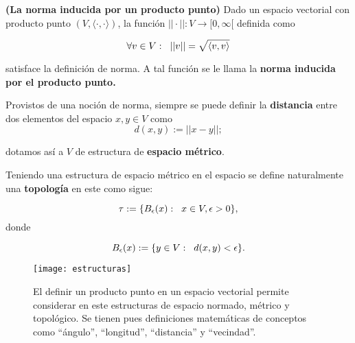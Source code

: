 \begin{prop}
\label{prop: La norma inducida por un producto punto}
\textbf{(La norma inducida por un producto punto)}
Dado un espacio vectorial con
producto punto $(V, \langle \cdot , \cdot \rangle )$, 
la función $|| \cdot || : V \longrightarrow [0, \infty[$ definida como

\begin{equation}
\label{eq: norma via producto punto}
\forall v \in V: \hspace{0.2cm} || v || = \sqrt{\langle v,v \rangle}
\end{equation}

\noindent
satisface la definición de norma. A tal función se le llama
la \textbf{norma inducida por el producto punto.}
\end{prop}

Provistos de una noción de norma, siempre se puede definir
la \textbf{distancia} entre dos elementos del espacio
$x, y \in V$ como 
\begin{equation}
\label{eq: distancia a partir de norma}
d(x, y) := ||x-y||;
\end{equation}

\noindent
dotamos así a $V$ de estructura de \textbf{espacio métrico}.

Teniendo una estructura de espacio métrico en el espacio se 
define naturalmente una \textbf{topología} en este como sigue:

\begin{equation}
\label{eq: top espacio con producto punto}
\tau := \{ B_{\epsilon}(x) : \hspace{0.2cm} x \in V, \epsilon >0 \},
\end{equation}
donde 

\[
B_{\epsilon}(x) := \{ y \in V : \hspace{0.2cm} d(x,y) < \epsilon \}.
\]


\begin{figure}[H]
\centering\captionsetup{format = hang}
	\begin{measuredfigure}
		\texttt{[image: estructuras]} 
		\caption{El definir un producto punto en un espacio
		vectorial permite considerar en este estructuras de espacio normado,
		métrico y topológico. Se tienen pues definiciones
		matemáticas de conceptos como ``ángulo'', ``longitud'',
		``distancia'' y ``vecindad''.}
 	\end{measuredfigure}
 \end{figure}


